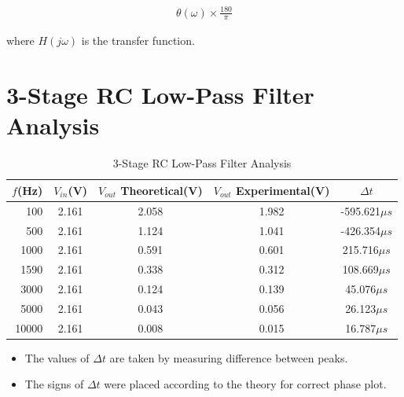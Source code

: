 \documentclass[12pt,a4paper]{report}
\begin{document}
\begin{align}
\theta(\omega) \times \frac{180}{\pi}
\end{align}

where \( H(j\omega) \) is the transfer function.
\section*{3-Stage RC Low-Pass Filter Analysis}
\begin{table}[h]
    \centering
    \begin{tabular}{r c c c c}
        \toprule
        $f$(Hz) & $V_{in}$(V) & $V_{out}$ Theoretical(V) & $V_{out}$ Experimental(V)& $\Delta t$ \\
        \midrule
        100  & 2.161 & 2.058 & 1.982 & -595.621$\mu s$ \\
        500  & 2.161 & 1.124 & 1.041 & -426.354$\mu s$\\
        1000 & 2.161 & 0.591 & 0.601 & 215.716$\mu s$\\
        1590 & 2.161 & 0.338 & 0.312 & 108.669$\mu s$\\
        3000 & 2.161 & 0.124 & 0.139 & 45.076$\mu s$ \\
        5000 & 2.161 & 0.043 & 0.056 & 26.123$\mu s$\\
        10000 & 2.161 & 0.008 & 0.015 & 16.787$\mu s$ \\
        \bottomrule
    \end{tabular}
    \caption{3-Stage RC Low-Pass Filter Analysis}
\end{table}
\begin{itemize}
    \item The values of $\Delta t$ are taken by measuring difference between peaks.
    \item The signs of $\Delta t$ were placed according to the theory for correct phase plot.
\end{itemize}
\end{document}
